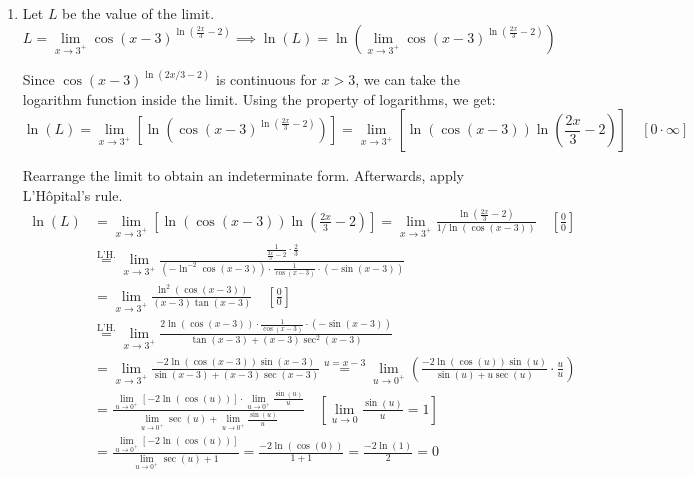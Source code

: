 \documentclass[a4paper, 12pt]{article}
\renewcommand{\headrulewidth}{0pt}
\begin{document}
\newpage
\pagestyle{fancy}
\renewcommand{\headrulewidth}{1pt}


\begin{enumerate}[leftmargin=*,label=\textbf{\arabic*.}]
\item Let $L$ be the value of the limit.
\[L = \lim_{x\to3^+}\cos(x-3)^{\ln\left(\frac{2x}{3}-2\right)}\implies\ln(L) =\ln\left( \lim_{x\to3^+}\cos(x-3)^{\ln\left(\frac{2x}{3}-2\right)}\right)\]

Since $\cos(x-3)^{\ln(2x/3 -2)}$ is continuous for $x>3$, we can take the logarithm function inside the limit. Using the property of logarithms, we get:
\[\ln(L) =\lim_{x\to3^+}\left[ \ln\left(\cos(x-3)^{\ln\left(\frac{2x}{3}-2\right)}\right)\right] = \lim_{x\to3^+}\left[ \ln\left(\cos(x-3)\right)\ln\left(\frac{2x}{3}-2\right)\right]\quad[0 \cdot \infty]\]

Rearrange the limit to obtain an indeterminate form. Afterwards, apply L'Hôpital's rule.
\begin{align*}\ln(L)&=\lim_{x\to3^+}\left[ \ln\left(\cos(x-3)\right)\ln\left(\frac{2x}{3}-2\right)\right] = \lim_{x\to3^+}\frac{\ln\left(\frac{2x}{3}-2\right)}{1/ \ln\left(\cos(x-3)\right)} \quad \left[\frac00\right] \\[1em]&\overset{\text{L'H.}}{=} \lim_{x\to3^+}\frac{\displaystyle\frac1{\frac{2x}{3} - 2}\cdot \frac{2}{3}}{\displaystyle \left(-\ln^{-2}\displaystyle \cos(x-3)\right)\cdot \frac{1}{\cos(x-3)}\cdot(-\sin(x-3))}\\[1em]&= \lim_{x\to3^+} \displaystyle\frac{\ln^2(\cos(x-3))}{(x-3)\tan(x-3)} \quad\left[\frac00\right]\\[1em]&\overset{\text{L'H.}}{=} \lim_{x\to3^+} \frac{\displaystyle2\ln(\cos(x-3))\cdot\frac{1}{\cos(x-3)}\cdot(-\sin(x-3))}{\tan(x-3) + (x-3)\sec^2(x-3)}\\[1em]&=\lim_{x\to3^+}\frac{\displaystyle-2\ln(\cos(x-3))\sin(x-3)}{\sin(x-3) + (x-3)\sec(x-3)} \overset{u=x-3}{=} \lim_{u\to0^+}\left(\frac{\displaystyle-2\ln(\cos(u))\sin(u)}{\sin(u) + u\sec(u)} \cdot\frac{u}{u}\right)\\[1em]& = \frac{\displaystyle\lim_{u\to0^+}[-2\ln(\cos(u))]\cdot \lim_{u\to0^+}\frac{\sin(u)}{u}}{\displaystyle\lim_{u\to0^+}\sec(u)+\lim_{u\to0^+}\frac{\sin(u)}{u}}\quad \left[\lim_{u\to0} \frac{\sin(u)}u=1\right]\\[1em]&=\frac{\displaystyle\lim_{u\to0^+}[-2\ln(\cos(u))]}{\displaystyle\lim_{u\to0^+}\sec(u)+1}  =\frac{-2\ln(\cos(0))}{1+1} =\frac{-2\ln(1)}{2} = 0\end{align*}


\end{enumerate}
\end{document}

